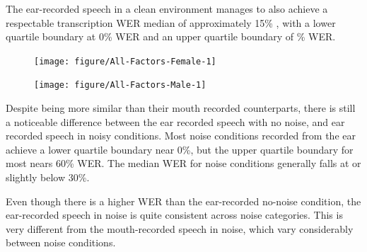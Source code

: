
{%
}
\DIFdelend The ear-recorded speech in a clean environment manages to also achieve a respectable transcription WER median of approximately 15\% \DIFaddbegin {}\DIFaddend , with a lower quartile boundary at 0\% WER and an upper quartile boundary of \DIFaddbegin {}\% WER.


\DIFaddbegin \begin{figure}[h!]

\texttt{[image: figure/All-Factors-Female-1]} 

\caption{}\label{fig:female-split}
\end{figure}

\begin{figure}[h!]

\texttt{[image: figure/All-Factors-Male-1]} 

\caption{}\label{fig:male-split}
\end{figure}


\DIFaddend Despite being more similar than their mouth recorded counterparts, there is still a noticeable difference between the ear recorded speech with no noise, and ear recorded speech in noisy conditions.  Most noise conditions recorded from the ear achieve a lower quartile boundary near 0\%, but the upper quartile boundary for most nears 60\% WER.  The median WER for noise conditions generally falls at or slightly below 30\%. 

Even though there is a higher WER than the ear-recorded no-noise condition, the ear-recorded speech in noise is quite consistent across noise categories.  This is very different from the mouth-recorded speech in noise, which vary considerably between noise conditions.    
\DIFaddbegin 


